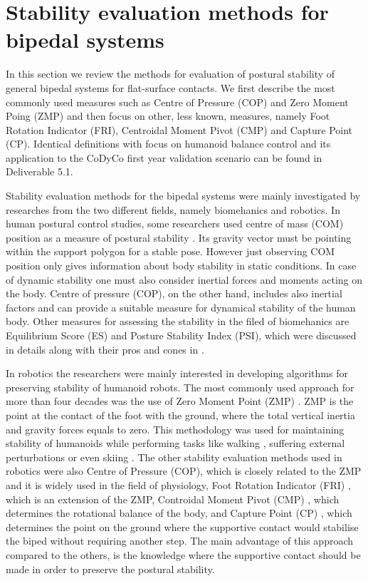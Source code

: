 \documentclass[12pt,a4paper,twoside]{article}
\begin{document}
\section{{Stability evaluation methods for bipedal systems}}

In this section we review the methods for evaluation of postural stability of general bipedal systems for flat-surface contacts. We first describe the most commonly used measures such as Centre of Pressure (COP) and Zero Moment Poing (ZMP) and then focus on other, less known, measures, namely Foot Rotation Indicator (FRI), Centroidal Moment Pivot (CMP) and Capture Point (CP). Identical definitions with focus on humanoid balance control  and its application to the CoDyCo first year validation scenario can be found in Deliverable 5.1. 

Stability evaluation methods for the bipedal systems were mainly investigated by researches from the two different fields, namely biomehanics and robotics. In human postural control studies, some researchers used centre of mass (COM) position as a measure of postural stability \cite{Maki2003}. Its gravity vector must be pointing within the support polygon for a stable pose. However just observing COM position only gives information about body stability in static conditions. In case of dynamic stability one must also consider inertial forces and moments acting on the body. Centre of pressure (COP), on the other hand, includes also inertial factors and can provide a suitable measure for dynamical stability of the human body. Other measures for assessing the stability in the filed of biomehanics are Equilibrium Score (ES) and Posture Stability Index (PSI), which were discussed in details along with their pros and cones in \cite{Chaudhry2011}.

In robotics the researchers were mainly interested in developing algorithms for preserving stability of humanoid robots. The most commonly used approach for more than four decades was the use of Zero Moment Point (ZMP) \cite{Vukobratovic1969,Kemp2008,Kajita2008,Hirai1998,Huang2001}. ZMP is the point at the contact of the foot with the ground, where the total vertical inertia and gravity forces equals to zero. This methodology was used for maintaining stability of humanoids while performing tasks like walking \cite{Li1993,Arakawa1997,Harada2003}, suffering external perturbations \cite{Hyon2007} or even skiing \cite{petrivc2013reflexive}. The other stability evaluation methods used in robotics were also Centre of Pressure (COP), which is closely related to the ZMP and it is widely used in the field of physiology, Foot Rotation Indicator (FRI) \cite{Goswami1999}, which is an extension of the ZMP, Controidal Moment Pivot (CMP) \cite{Popovic2004}, which determines the rotational balance of the body, and Capture Point (CP) \cite{Pratt2006}, which determines the point on the ground where the supportive contact would stabilise the biped without requiring another step. The main advantage of this approach compared to the others, is the knowledge where the supportive contact should be made in order to preserve the postural stability.
\end{document}
